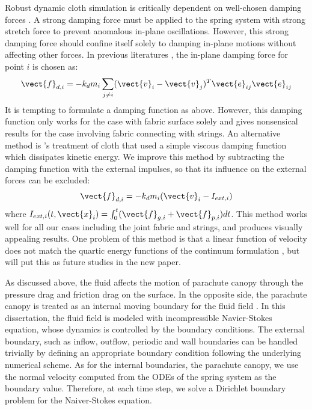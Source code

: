 Robust dynamic cloth simulation is critically dependent on well-chosen damping forces \cite{Baraff1998Large}. A strong damping force must be applied to the spring system with strong stretch force to prevent anomalous in-plane oscillations. However, this strong damping force should confine itself solely to damping in-plane motions without affecting other forces. In previous literatures \cite{Selle2009Robust}, the in-plane damping force for point $i$ is chosen as:
\begin{equation}
\vect{f}_{d,i} = -k_d m_i\sum_{j \neq i}(\vect{v}_i - \vect{v}_j)^T\vect{e}_{ij}\vect{e}_{ij}
\label{eq:damping_1} 
\end{equation}
It is tempting to formulate a damping function as above. However, this damping function only works for the case with fabric surface solely and gives nonsensical results for the case involving fabric connecting with strings. An alternative method is \cite{Terzopoulos1987, Terzopoulos1988, Carignan1992, Platt1988}'s treatment of cloth that used a simple viscous damping function which dissipates kinetic energy. We improve this method by subtracting the damping function with the external impulses, so that its influence on the external forces can be excluded:
\begin{equation}
\vect{f}_{d,i} = -k_d m_i(\vect{v}_i-I_{ext,i})
\end{equation}
where $I_{ext,i}(t,\vect{x}_i) = \int_0^t (\vect{f}_{g,i} + \vect{f}_{p,i}) dt$.
This method works well for all our cases including the joint fabric and strings, and produces visually appealing results. One problem of this method is that a linear function of velocity does not match the quartic energy functions of the continuum formulation \cite{Baraff1998Large}, but will put this as future studies in the new paper.

As discussed above, the fluid affects the motion of parachute canopy through the pressure drag and friction drag on the surface. In the opposite side, the parachute canopy is treated as an internal moving boundary for the fluid field \cite{Kim2013Simulation}. In this dissertation, the fluid field is modeled with incompressible Navier-Stokes equation, whose dynamics is controlled by the boundary conditions. The external boundary, such as inflow, outflow, periodic and wall boundaries can be handled trivially by defining an appropriate boundary condition following the underlying numerical scheme. As for the internal boundaries, the parachute canopy, we use the normal velocity computed from the ODEs of the spring system as the boundary value. Therefore, at each time step, we solve a Dirichlet boundary problem for the Naiver-Stokes equation.

